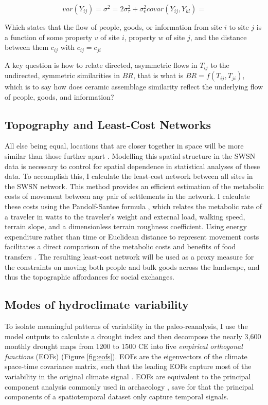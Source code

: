 \documentclass[fleqn,10pt]{wlscirep}
\begin{document}
\begin{equation}
    var(Y_{ij}) = \sigma^2 = 2\sigma^{2}_{\tau} + \sigma^{2}_{\epsilon}
    covar(Y_{ij}, Y_{kl}) =  
\end{equation}

Which states that the flow of people, goods, or information from site $i$ to site $j$ is a function of some property $v$ of site $i$, property $w$ of site $j$, and the distance between them $c_{ij}$ with $c_{ij} = c_{ji}$

A key question is how to relate directed, asymmetric flows in $T_{ij}$ to the undirected, symmetric similarities in $BR$, that is what is $BR = f(T_{ij},T_{ji})$, which is to say how does ceramic assemblage similarity reflect the underlying flow of people, goods, and information?

\subsection*{Topography and Least-Cost Networks}
All else being equal, locations that are closer together in space will be more similar than those further apart \cite{Tobler1970}. Modelling this spatial structure in the SWSN data is necessary to control for spatial dependence in statistical analyses of these data. To accomplish this, I calculate the least-cost network between all sites in the SWSN network. This method provides an efficient estimation of the metabolic costs of movement between any pair of settlements in the network. I calculate these costs using the Pandolf-Santee formula \cite{White2012}, which relates the metabolic rate of a traveler in watts to the traveler's weight and external load, walking speed, terrain slope, and a dimensionless terrain roughness coefficient. Using energy expenditure rather than time or Euclidean distance to represent movement costs facilitates a direct comparison of the metabolic costs and benefits of food transfers  \cite{Drennan1984}. The resulting least-cost network will be used as a proxy measure for the constraints on moving both people and bulk goods across the landscape, and thus the topographic affordances for social exchanges.

\subsection*{Modes of hydroclimate variability}
To isolate meaningful patterns of variability in the paleo-reanalysis, I use the model outputs to calculate a drought index and then decompose the nearly 3,600 monthly drought maps from 1200 to 1500 CE into five \textit{empirical orthogonal functions} (EOFs) (Figure \ref{fig:eofs}). EOFs are the eigenvectors of the climate space-time covariance matrix, such that the leading EOFs capture most of the variability in the original climate signal \cite{Lorenz1956EmpiricalPrediction}. EOFs are equivalent to the principal component analysis commonly used in archaeology \cite[e.g.]{Dean1996DemographyStress}, save for that the principal components of a spatiotemporal dataset only capture temporal signals.
\end{document}
